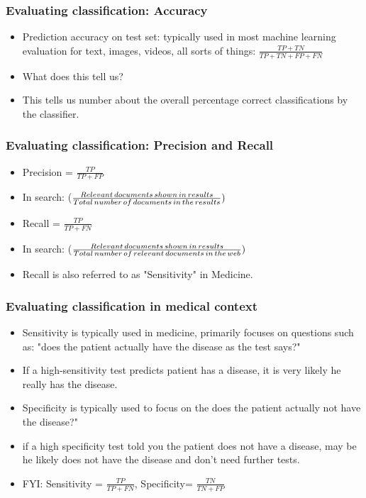 \documentclass{beamer}
\begin{document}
\begin{frame}
\frametitle{Evaluating classification: Accuracy}
\begin{itemize}
\item Prediction accuracy on test set: typically used in most machine learning evaluation for text, images, videos, all sorts of things:  $\frac{TP+TN}{TP+TN+FP+FN}$
\item What does this tell us? \pause
\item This tells us number about the overall percentage correct classifications by the classifier. 
\end{itemize}
\end{frame}

\begin{frame}
\frametitle{Evaluating classification: Precision and Recall}
\begin{itemize}
\item Precision = $\frac{TP}{TP+FP}$ 
\item In search: ($\frac{Relevant\thinspace documents\thinspace shown\thinspace in\thinspace results}{Total\thinspace number\thinspace of \thinspace documents\thinspace in\thinspace the\thinspace results})$
\item  Recall = $\frac{TP}{TP+FN}$
\item In search: ($\frac{Relevant\thinspace documents\thinspace shown\thinspace in\thinspace results}{Total\thinspace number\thinspace of \thinspace relevant \thinspace documents\thinspace in\thinspace the\thinspace web})$
\item Recall is also referred to as "Sensitivity" in Medicine.
\end{itemize}
\end{frame}

\begin{frame}
\frametitle{Evaluating classification in medical context}
\begin{itemize}
\item Sensitivity is typically used in medicine, primarily focuses on questions such as: "does the patient actually have the disease as the test says?"
\item If a high-sensitivity test predicts patient has a disease, it is very likely he really has the disease. \pause
\item Specificity is typically used to focus on the does the patient actually not have the disease?"
\item if a high specificity test told you the patient does not have a disease, may be he likely does not have the disease and don't need further tests.
\item FYI: Sensitivity = $\frac{TP}{TP+FN}$, Specificity= $\frac{TN}{TN+FP}$
\end{itemize}
\end{frame}
\end{document}
